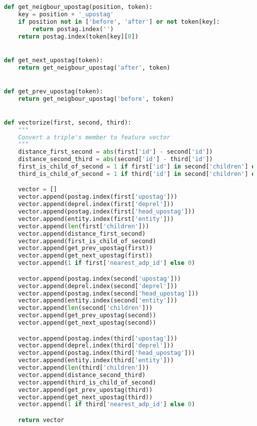 \begin{lstlisting}[language=Python]
def get_neigbour_upostag(position, token):
    key = position + '_upostag'
    if position not in ['before', 'after'] or not token[key]:
        return postag.index('')
    return postag.index(token[key][0])


def get_next_upostag(token):
    return get_neigbour_upostag('after', token)


def get_prev_upostag(token):
    return get_neigbour_upostag('before', token)


def vectorize(first, second, third):
    """
    Convert a triple's member to feature vector
    """
    distance_first_second = abs(first['id'] - second['id'])
    distance_second_third = abs(second['id'] - third['id'])
    first_is_child_of_second = 1 if first['id'] in second['children'] else 0
    third_is_child_of_second = 1 if third['id'] in second['children'] else 0

    vector = []
    vector.append(postag.index(first['upostag']))
    vector.append(deprel.index(first['deprel']))
    vector.append(postag.index(first['head_upostag']))
    vector.append(entity.index(first['entity']))
    vector.append(len(first['children']))
    vector.append(distance_first_second)
    vector.append(first_is_child_of_second)
    vector.append(get_prev_upostag(first))
    vector.append(get_next_upostag(first))
    vector.append(1 if first['nearest_adp_id'] else 0)

    vector.append(postag.index(second['upostag']))
    vector.append(deprel.index(second['deprel']))
    vector.append(postag.index(second['head_upostag']))
    vector.append(entity.index(second['entity']))
    vector.append(len(second['children']))
    vector.append(get_prev_upostag(second))
    vector.append(get_next_upostag(second))

    vector.append(postag.index(third['upostag']))
    vector.append(deprel.index(third['deprel']))
    vector.append(postag.index(third['head_upostag']))
    vector.append(entity.index(third['entity']))
    vector.append(len(third['children']))
    vector.append(distance_second_third)
    vector.append(third_is_child_of_second)
    vector.append(get_prev_upostag(third))
    vector.append(get_next_upostag(third))
    vector.append(1 if third['nearest_adp_id'] else 0)

    return vector



\end{lstlisting}
